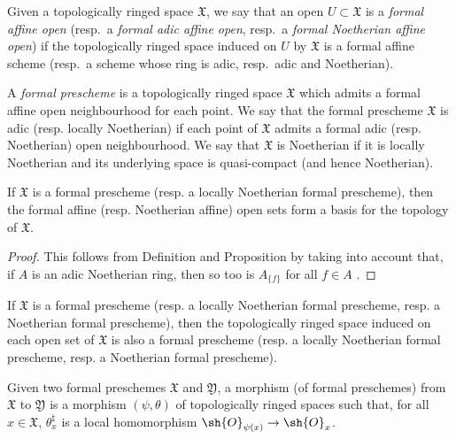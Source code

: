 \begin{env}[10.4.1]
\label{I.10.4.1}
Given a topologically ringed space $\mathfrak{X}$, we say that an open $U\subset\mathfrak{X}$ is a \emph{formal affine open} (resp.~a \emph{formal adic affine open}, resp.~a \emph{formal Noetherian affine open}) if the topologically ringed space induced on $U$ by $\mathfrak{X}$ is a formal affine scheme (resp.~a scheme whose ring is adic, resp.~adic and Noetherian).
\end{env}

\begin{definition}[10.4.2]
\label{I.10.4.2}
A \emph{formal prescheme} is a topologically ringed space $\mathfrak{X}$ which admits a formal affine open neighbourhood for each point.
We say that the formal prescheme $\mathfrak{X}$ is adic (resp. locally Noetherian) if each point of $\mathfrak{X}$ admits a formal adic (resp. Noetherian) open neighbourhood.
We say that $\mathfrak{X}$ is Noetherian if it is locally Noetherian and its underlying space is quasi-compact (and hence Noetherian).
\end{definition}

\begin{proposition}[10.4.3]
\label{I.10.4.3}
If $\mathfrak{X}$ is a formal prescheme (resp. a locally Noetherian formal prescheme), then the formal affine (resp. Noetherian affine) open sets form a basis for the topology of $\mathfrak{X}$.
\end{proposition}

\begin{proof}
This follows from Definition  and Proposition  by taking into account that, if $A$ is an adic Noetherian ring, then so too is $A_{\{f\}}$ for all $f\in A$ .
\end{proof}

\begin{corollary}[10.4.4]
\label{I.10.4.4}
If $\mathfrak{X}$ is a formal prescheme (resp. a locally Noetherian formal prescheme, resp. a Noetherian formal prescheme), then the topologically ringed space induced on each open set of $\mathfrak{X}$ is also a formal prescheme (resp. a locally Noetherian formal prescheme, resp. a Noetherian formal prescheme).
\end{corollary}

\begin{definition}[10.4.5]
\label{I.10.4.5}
Given two formal preschemes $\mathfrak{X}$ and $\mathfrak{Y}$, a morphism (of formal preschemes) from $\mathfrak{X}$ to $\mathfrak{Y}$ is a morphism $(\psi,\theta)$ of topologically ringed spaces such that, for all $x\in\mathfrak{X}$, $\theta_x^\sharp$ is a local homomorphism $\sh{O}_{\psi(x)}\to\sh{O}_x$.
\end{definition}

